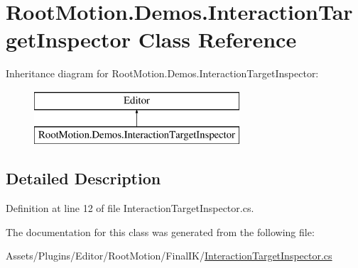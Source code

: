\hypertarget{class_root_motion_1_1_demos_1_1_interaction_target_inspector}{}\section{Root\+Motion.\+Demos.\+Interaction\+Target\+Inspector Class Reference}
\label{class_root_motion_1_1_demos_1_1_interaction_target_inspector}
Inheritance diagram for Root\+Motion.\+Demos.\+Interaction\+Target\+Inspector\+:\begin{figure}[H]
\begin{center}
\leavevmode
\includegraphics[height=2.000000cm]{class_root_motion_1_1_demos_1_1_interaction_target_inspector}
\end{center}
\end{figure}


\subsection{Detailed Description}


Definition at line 12 of file Interaction\+Target\+Inspector.\+cs.



The documentation for this class was generated from the following file\+:\begin{DoxyCompactItemize}
\item 
Assets/\+Plugins/\+Editor/\+Root\+Motion/\+Final\+I\+K/\mbox{\hyperlink{_interaction_target_inspector_8cs}{Interaction\+Target\+Inspector.\+cs}}\end{DoxyCompactItemize}
